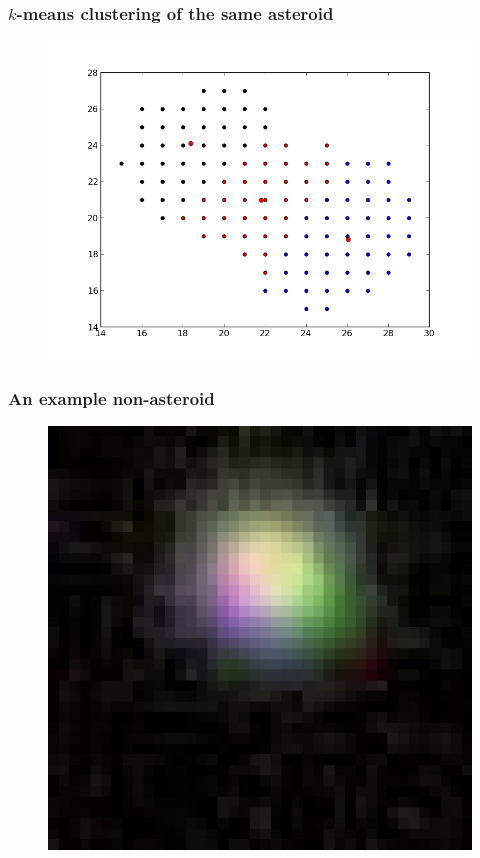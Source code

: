 \documentclass{beamer}
\begin{document}
\begin{frame}
    \frametitle{$k$-means clustering of the same asteroid}
    \begin{figure}
        \centering
        \includegraphics[height=0.8\paperheight]{clust-18364.png}
    \end{figure}
\end{frame}

\begin{frame}
    \frametitle{An example non-asteroid}
    \begin{figure}
        \centering
        \includegraphics[height=0.8\paperheight]{494_large.jpg}
    \end{figure}
\end{frame}
\end{document}
